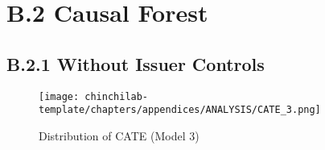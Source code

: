 \section{B.2 Causal Forest}


\subsection{B.2.1 Without Issuer Controls}

\begin{figure}[H]
    \centering
    \texttt{[image: chinchilab-template/chapters/appendices/ANALYSIS/CATE\_3.png]}
    \caption{Distribution of CATE (Model 3)}
    \label{fig:my_label}
\end{figure}

